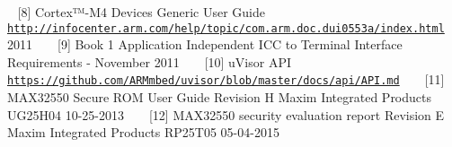 ~\newline
\label{_r_e_f_e_r_e_n_c_e_s_DOC8}%
%
\mbox{[}8\mbox{]} Cortex™-\/\+M4 Devices Generic User Guide \href{http://infocenter.arm.com/help/topic/com.arm.doc.dui0553a/index.html}{\tt http\+://infocenter.\+arm.\+com/help/topic/com.\+arm.\+doc.\+dui0553a/index.\+html} 2011 ~\newline
~\newline
\label{_r_e_f_e_r_e_n_c_e_s_DOC9}%
%
\mbox{[}9\mbox{]} Book 1 Application Independent I\+CC to Terminal Interface Requirements -\/ November 2011 ~\newline
~\newline
\label{_r_e_f_e_r_e_n_c_e_s_DOC10}%
%
\mbox{[}10\mbox{]} u\+Visor A\+PI \href{https://github.com/ARMmbed/uvisor/blob/master/docs/api/API.md}{\tt https\+://github.\+com/\+A\+R\+Mmbed/uvisor/blob/master/docs/api/\+A\+P\+I.\+md} ~\newline
~\newline
\label{_r_e_f_e_r_e_n_c_e_s_DOC11}%
%
\mbox{[}11\mbox{]} M\+A\+X32550 Secure R\+OM User Guide Revision H Maxim Integrated Products U\+G25\+H04 10-\/25-\/2013 ~\newline
~\newline
\label{_r_e_f_e_r_e_n_c_e_s_DOC12}%
%
\mbox{[}12\mbox{]} M\+A\+X32550 security evaluation report Revision E Maxim Integrated Products R\+P25\+T05 05-\/04-\/2015 